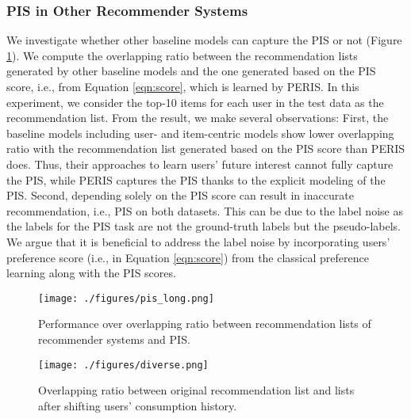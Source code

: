 \documentclass[sigconf]{acmart}
\newcommand{\MD}{{\small\textsf{PERIS}}}
\begin{document}
\subsubsection{\textbf{PIS in Other Recommender Systems}} We investigate whether other baseline models can capture the PIS or not (Figure \ref{fig:overlap}). We compute the overlapping ratio between the recommendation lists generated by other baseline models and the one generated based on the PIS score, i.e.,  from Equation \ref{eqn:score}, which is learned by \MD{}. In this experiment, we consider the top-10 items for each user in the test data as the recommendation list. From the result, we make several observations: First, the baseline models including user- and item-centric models show lower overlapping ratio with the recommendation list generated based on the PIS score than \MD{} does. Thus, their approaches to learn users' future interest cannot fully capture the PIS, while \MD{} captures the PIS thanks to the explicit modeling of the PIS. 
Second, depending solely on the PIS score can result in inaccurate recommendation, i.e., PIS on both datasets. This can be due to the label noise as the labels for the PIS task are not the ground-truth labels but the pseudo-labels. 
We argue that it is beneficial to address the label noise by incorporating users' preference score (i.e.,  in Equation \ref{eqn:score}) from the classical preference learning along with the PIS scores.


\begin{figure}[t]
	\centering
	\texttt{[image: ./figures/pis\_long.png]}
	\caption{Performance over overlapping ratio between recommendation lists of recommender systems and PIS.  }
     \label{fig:overlap}
\end{figure}


\begin{figure}[t]
	\centering
	\texttt{[image: ./figures/diverse.png]}
	\caption{Overlapping ratio between original recommendation list and lists after shifting users' consumption history.}
	\label{fig:diverse}
\end{figure}
\end{document}
